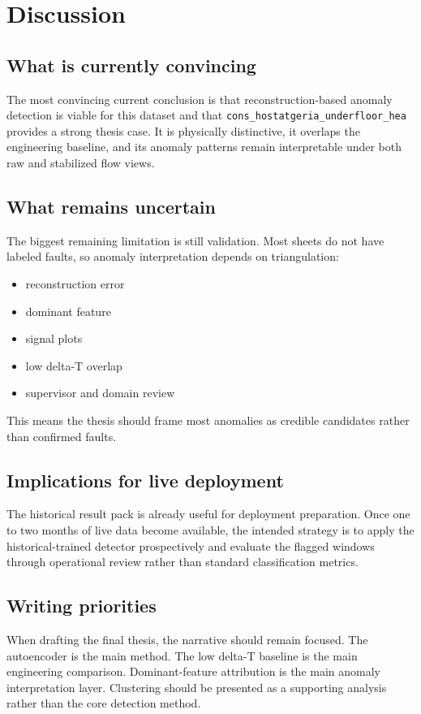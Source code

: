 \section{Discussion}

\subsection{What is currently convincing}

The most convincing current conclusion is that reconstruction-based anomaly detection is viable for this dataset and that \texttt{cons\_hostatgeria\_underfloor\_hea} provides a strong thesis case. It is physically distinctive, it overlaps the engineering baseline, and its anomaly patterns remain interpretable under both raw and stabilized flow views.

\subsection{What remains uncertain}

The biggest remaining limitation is still validation. Most sheets do not have labeled faults, so anomaly interpretation depends on triangulation:

\begin{itemize}
\item reconstruction error
\item dominant feature
\item signal plots
\item low delta-T overlap
\item supervisor and domain review
\end{itemize}

This means the thesis should frame most anomalies as credible candidates rather than confirmed faults.

\subsection{Implications for live deployment}

The historical result pack is already useful for deployment preparation. Once one to two months of live data become available, the intended strategy is to apply the historical-trained detector prospectively and evaluate the flagged windows through operational review rather than standard classification metrics.

\subsection{Writing priorities}

When drafting the final thesis, the narrative should remain focused. The autoencoder is the main method. The low delta-T baseline is the main engineering comparison. Dominant-feature attribution is the main anomaly interpretation layer. Clustering should be presented as a supporting analysis rather than the core detection method.
